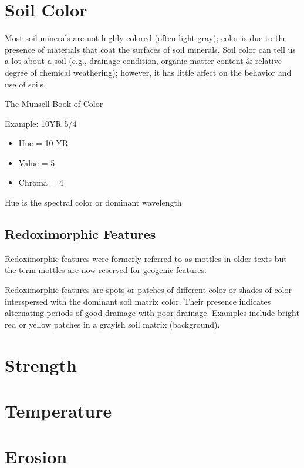 \documentclass[a5paper]{report}
\begin{document}
\section{Soil Color}
\label{color}
    
Most soil minerals are not highly colored (often light gray); color is due to the presence of materials that coat the surfaces of soil minerals. Soil color can tell us a lot about a soil (e.g., drainage condition, organic matter content \& relative degree of chemical weathering); however, it has little affect on the behavior and use of soils.
    
The Munsell Book of Color
    
Example: 10YR 5/4
    
\begin{itemize}
    \item Hue = 10 YR
    \item Value = 5
    \item Chroma = 4
\end{itemize}
    
Hue is the spectral color or dominant wavelength
    
\subsection{Redoximorphic Features}
    
Redoximorphic features were formerly referred to as mottles in older texts but the term mottles are now reserved for geogenic features.
    
Redoximorphic features are spots or patches of different color or shades of color interspersed with the dominant soil matrix color. Their presence indicates alternating periods of good drainage with poor drainage. Examples include bright red or yellow patches in a grayish soil matrix (background).

\section{Strength}
\label{strength}


\section{Temperature}
\label{temperature}


\section{Erosion}
\label{erosion}

\end{document}
